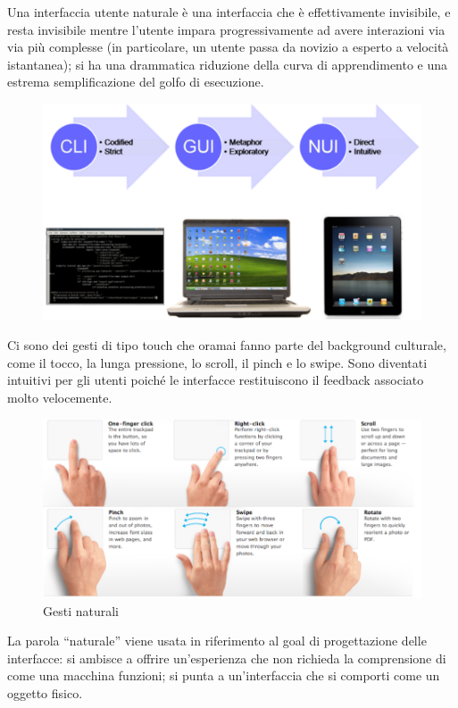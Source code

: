 Una interfaccia utente naturale è una interfaccia che è effettivamente invisibile, e resta invisibile mentre l'utente impara progressivamente ad avere
interazioni via via più complesse (in particolare, un utente passa da novizio a esperto a velocità istantanea); si ha una drammatica riduzione della
curva di apprendimento e una estrema semplificazione del golfo di esecuzione.
\pagebreak
\begin{figure}[!h]
	\centering
	\includegraphics[scale=0.3]{immagini/nui-concetto.png}
\end{figure}

Ci sono dei gesti di tipo touch che oramai fanno parte del background culturale, come il tocco, la lunga pressione, lo scroll, il pinch e lo swipe.
Sono diventati intuitivi per gli utenti poich\'e le interfacce restituiscono il feedback associato molto velocemente.
\begin{figure}[!h]
	\centering
	\includegraphics[scale=0.3]{immagini/nui-gesti-naturali.png}
	\caption{Gesti naturali}
\end{figure}

La parola ``naturale'' viene usata in riferimento al goal di progettazione delle interfacce: si ambisce a offrire un'esperienza che non richieda
la comprensione di come una macchina funzioni; si punta a un'interfaccia che si comporti come un oggetto fisico.

